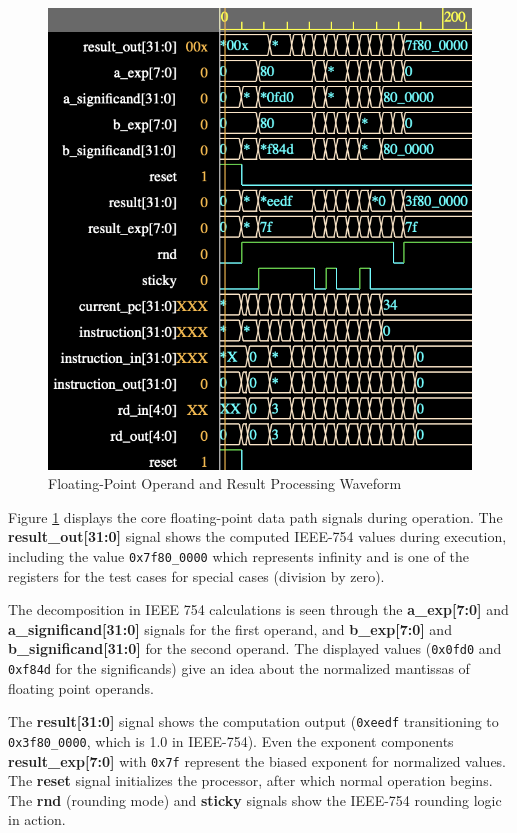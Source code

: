 \begin{figure}[htbp]
    \centering
    \includegraphics[width=\textwidth]{figures/waveform1.png}
    \caption{Floating-Point Operand and Result Processing Waveform}
    \label{fig:waveform1}
\end{figure}

Figure \ref{fig:waveform1} displays the core floating-point data path signals during operation. The \textbf{result\_out[31:0]} signal shows the computed IEEE-754 values during execution, including the value \texttt{0x7f80\_0000} which represents infinity and is one of the registers for the test cases for special cases (division by zero).

The decomposition in IEEE 754 calculations is seen through the \textbf{a\_exp[7:0]} and \textbf{a\_significand[31:0]} signals for the first operand, and \textbf{b\_exp[7:0]} and \textbf{b\_significand[31:0]} for the second operand. The displayed values (\texttt{0x0fd0} and \texttt{0xf84d} for the significands) give an idea about the normalized mantissas of floating point operands.

The \textbf{result[31:0]} signal shows the computation output (\texttt{0xeedf} transitioning to \texttt{0x3f80\_0000}, which is 1.0 in IEEE-754). Even the exponent components \textbf{result\_exp[7:0]} with \texttt{0x7f} represent the biased exponent for normalized values. The \textbf{reset} signal initializes the processor, after which normal operation begins. The \textbf{rnd} (rounding mode) and \textbf{sticky} signals show the IEEE-754 rounding logic in action.

